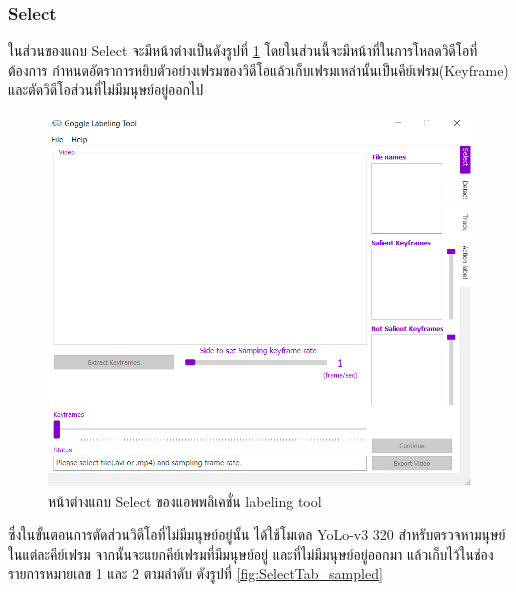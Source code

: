 \subsubsection{Select}
ในส่วนของแถบ Select จะมีหน้าต่างเป็นดังรูปที่ \ref{fig:selectTab} โดยในส่วนนี้จะมีหน้าที่ในการโหลดวิดีโอที่ต้องการ
กำหนดอัตราการหยิบตัวอย่างเฟรมของวิดีโอแล้วเก็บเฟรมเหล่านั้นเป็นคีย์เฟรม(Keyframe) และตัดวิดีโอส่วนที่ไม่มีมนุษย์อยู่ออกไป
\begin{figure}[!ht]
    \centering
    \includegraphics[width=1\textwidth]{chapter3/images/3_3/SelectTab.png}
    \caption{หน้าต่างแถบ Select ของแอพพลิเคชั่น labeling tool}
    \label{fig:selectTab}
\end{figure}
\clearpage
ซึ่งในขั้นตอนการตัดส่วนวิดีโอที่ไม่มีมนุษย์อยู่นั้น ได้ใช้โมเดล YoLo-v3 320 สำหรับตรวจหามนุษย์ในแต่ละคีย์เฟรม
จากนั้นจะแยกคีย์เฟรมที่มีมนุษย์อยู่ และที่ไม่มีมนุษย์อยู่ออกมา แล้วเก็บไว้ในช่องรายการหมายเลข 1 และ 2 ตามลำดับ
ดังรูปที่ \ref{fig:SelectTab_sampled}

